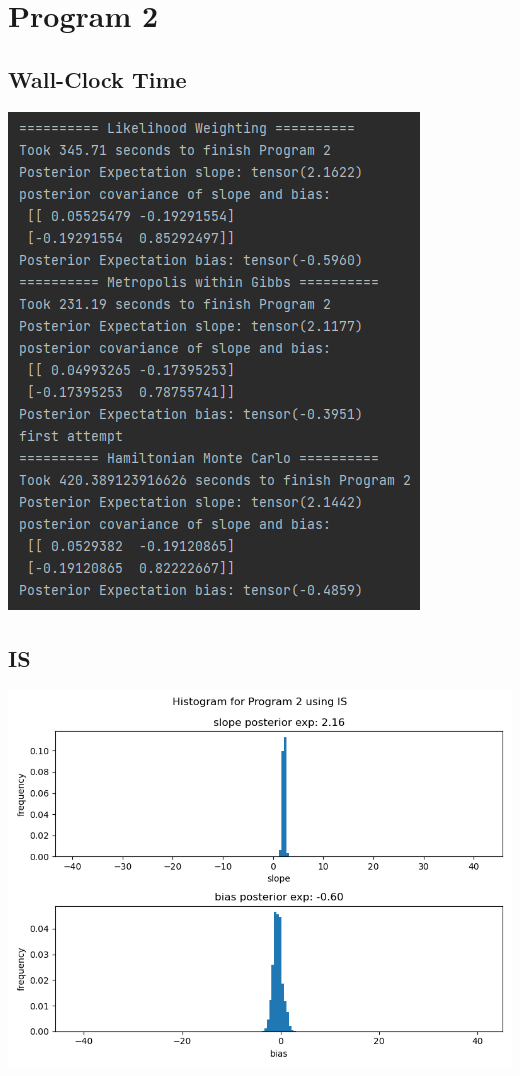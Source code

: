 \documentclass[10pt]{homeworg}
\begin{document}

\section{Program 2}
\subsection{Wall-Clock Time}
\begin{center}
\includegraphics{figures/program_2_time.png}
\end{center}


\subsection{IS}
\begin{center}
\includegraphics[scale=0.5]{figures/IS_program_2.png}
\end{center}
\end{document}
